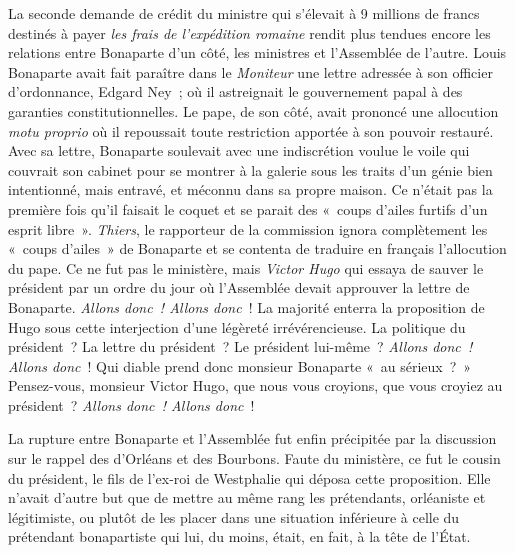 \documentclass[twoside]{book} %
\begin{document}
La seconde demande de crédit du ministre qui s’élevait à 9 millions de francs destinés à payer \emph{les frais de l’expédition romaine} rendit plus tendues encore les relations entre Bonaparte d’un côté, les ministres et l’Assemblée de l’autre. Louis Bonaparte avait fait paraître dans le \emph{Moniteur} une lettre adressée à son officier d’ordonnance, Edgard Ney ; où il astreignait le gouvernement papal à des garanties constitutionnelles. Le pape, de son côté, avait prononcé une allocution \emph{motu proprio} où il repoussait toute restriction apportée à son pouvoir restauré. Avec sa lettre, Bonaparte soulevait avec une indiscrétion voulue le voile qui couvrait son cabinet pour se montrer à la galerie sous les traits d’un génie bien intentionné, mais entravé, et méconnu dans sa propre maison. Ce n’était pas la première fois qu’il faisait le coquet et se parait des « coups d’ailes furtifs d’un esprit libre ». \emph{Thiers}, le rapporteur de la commission ignora complètement les « coups d’ailes » de Bonaparte et se contenta de traduire en français l’allocution du pape. Ce ne fut pas le ministère, mais \emph{Victor Hugo} qui essaya de sauver le président par un ordre du jour où l’Assemblée devait approuver la lettre de Bonaparte. \emph{Allons donc ! Allons donc} ! La majorité enterra la proposition de Hugo sous cette interjection d’une légèreté irrévérencieuse. La politique du président ? La lettre du président ? Le président lui-même ? \emph{Allons donc ! Allons donc} ! Qui diable prend donc monsieur Bonaparte « au sérieux ? » Pensez-vous, monsieur Victor Hugo, que nous vous croyions, que vous croyiez au président ? \emph{Allons donc ! Allons donc} !\par
La rupture entre Bonaparte et l’Assemblée fut enfin précipitée par la discussion sur le rappel des d’Orléans et des Bourbons. Faute du ministère, ce fut le cousin du président, le fils de l’ex-roi de Westphalie qui déposa cette proposition. Elle n’avait d’autre but que de mettre au même rang les prétendants, orléaniste et légitimiste, ou plutôt de les placer dans une situation inférieure à celle du prétendant bonapartiste qui lui, du moins, était, en fait, à la tête de l’État.\par
\end{document}
